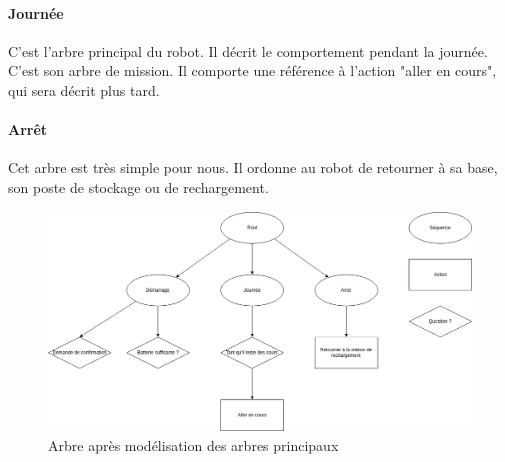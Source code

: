 \documentclass[titlepage]{article}
\begin{document}
	\paragraph{Journée}
	C'est l'arbre principal du robot. Il décrit le comportement pendant la journée. C'est son arbre de mission. Il comporte une référence à l'action "aller en cours", qui sera décrit plus tard.
	\paragraph{Arrêt}
	Cet arbre est très simple pour nous. Il ordonne au robot de retourner à sa base, son poste de stockage ou de rechargement.
	\\
	\begin{figure}[h!]
		\centering
		\includegraphics[width=\linewidth]{img/BT_4.png}
		\caption{Arbre après modélisation des arbres principaux}
		\label{fig:exemple_3}
	\end{figure}
\end{document}

